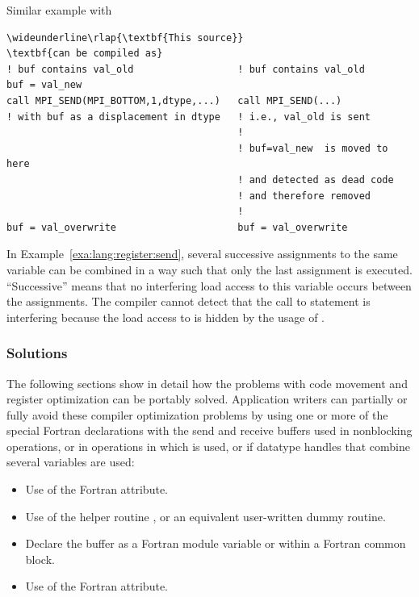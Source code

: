 \begin{example}
Similar example with 
\label{exa:lang:register:send}
%
%

\begin{Verbatim}[commandchars=\\\{\}]
\wideunderline\rlap{\textbf{This source}}                                        \textbf{can be compiled as}
! buf contains val_old                  ! buf contains val_old
buf = val_new
call MPI_SEND(MPI_BOTTOM,1,dtype,...)   call MPI_SEND(...)
! with buf as a displacement in dtype   ! i.e., val_old is sent
                                        !
                                        ! buf=val_new  is moved to here
                                        ! and detected as dead code
                                        ! and therefore removed
                                        !
buf = val_overwrite                     buf = val_overwrite
\end{Verbatim}
\lstset{fancyvrb=false}
\end{example}

In Example~\ref{exa:lang:register:send},
several successive assignments to the same variable  can be combined in a way
such that only the last assignment is executed.
``Successive'' means that no interfering load access to this variable occurs between the assignments.
The compiler cannot detect that the call to  statement is interfering
because the load access to  is hidden by the usage of .

\subsubsection{Solutions}
\label{sec:f90-problems:code-movements:solutions}

The following sections show in detail how the problems
with code movement and register optimization can be
portably solved.
Application writers can partially or fully avoid these compiler optimization problems
by using one or more of the special Fortran declarations with
the send and receive buffers used in nonblocking operations, or in operations
in which  is used, or if datatype handles that combine several variables are used:
\begin{itemize}
\item Use of the Fortran  attribute.
\item Use of the helper routine ,
      or an equivalent user-written dummy routine.
\item Declare the buffer as a Fortran module variable or within a Fortran common block.
\item Use of the Fortran  attribute.
\end{itemize}

